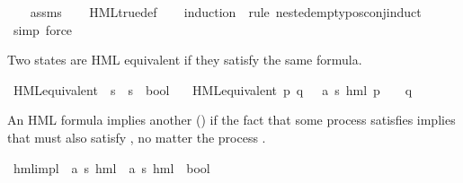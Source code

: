 \begin{isabellebody}
%
\isadelimproof
\ \ %
\endisadelimproof
%
\isatagproof
{}\isamarkupfalse%
\ assms\isanewline
\ \ \isamarkupfalse%
\ HML{\isacharunderscore}{\kern0pt}true{\isacharunderscore}{\kern0pt}def\isanewline
\ \ \isamarkupfalse%
\ {\isacharparenleft}{\kern0pt}induction\ {\isasymphi}\ rule{\isacharcolon}{\kern0pt}\ nested{\isacharunderscore}{\kern0pt}empty{\isacharunderscore}{\kern0pt}pos{\isacharunderscore}{\kern0pt}conj{\isachardot}{\kern0pt}induct{\isacharparenright}{\kern0pt}\isanewline
\ \ \isamarkupfalse%
\ {\isacharparenleft}{\kern0pt}simp{\isacharcomma}{\kern0pt}\ force{\isacharparenright}{\kern0pt}%
\endisatagproof
{\isafoldproof}%
%
\isadelimproof
%
\endisadelimproof
%
\begin{isamarkuptext}%
Two states are HML equivalent if they satisfy the same formula.%
\end{isamarkuptext}\isamarkuptrue%
\isamarkupfalse%
\ HML{\isacharunderscore}{\kern0pt}equivalent\ {\isacharcolon}{\kern0pt}{\isacharcolon}{\kern0pt}\ {\isacartoucheopen}{\isacharprime}{\kern0pt}s\ {\isasymRightarrow}\ {\isacharprime}{\kern0pt}s\ {\isasymRightarrow}\ bool{\isacartoucheclose}\ \isanewline
\ \ {\isacartoucheopen}HML{\isacharunderscore}{\kern0pt}equivalent\ p\ q\ {\isasymequiv}\ {\isacharparenleft}{\kern0pt}{\isasymforall}\ {\isasymphi}{\isacharcolon}{\kern0pt}{\isacharcolon}{\kern0pt}{\isacharparenleft}{\kern0pt}{\isacharprime}{\kern0pt}a{\isacharcomma}{\kern0pt}\ {\isacharprime}{\kern0pt}s{\isacharparenright}{\kern0pt}\ hml{\isachardot}{\kern0pt}\ {\isacharparenleft}{\kern0pt}p\ {\isasymTurnstile}\ {\isasymphi}{\isacharparenright}{\kern0pt}\ {\isasymlongleftrightarrow}\ {\isacharparenleft}{\kern0pt}q\ {\isasymTurnstile}\ {\isasymphi}{\isacharparenright}{\kern0pt}{\isacharparenright}{\kern0pt}{\isacartoucheclose}%
\begin{isamarkuptext}%
An HML formula  implies another () if the fact that some process  satisfies 
implies that  must also satisfy , no matter the process .%
\end{isamarkuptext}\isamarkuptrue%
\isamarkupfalse%
\ hml{\isacharunderscore}{\kern0pt}impl\ {\isacharcolon}{\kern0pt}{\isacharcolon}{\kern0pt}\ {\isachardoublequoteopen}{\isacharparenleft}{\kern0pt}{\isacharprime}{\kern0pt}a{\isacharcomma}{\kern0pt}\ {\isacharprime}{\kern0pt}s{\isacharparenright}{\kern0pt}\ hml\ {\isasymRightarrow}\ {\isacharparenleft}{\kern0pt}{\isacharprime}{\kern0pt}a{\isacharcomma}{\kern0pt}\ {\isacharprime}{\kern0pt}s{\isacharparenright}{\kern0pt}\ hml\ {\isasymRightarrow}\ bool{\isachardoublequoteclose}\ {\isacharparenleft}{\kern0pt}\ {\isachardoublequoteopen}{\isasymRrightarrow}{\isachardoublequoteclose}\ {}{}{\isacharparenright}{\kern0pt}\ \ \isanewline

\end{isabellebody}
